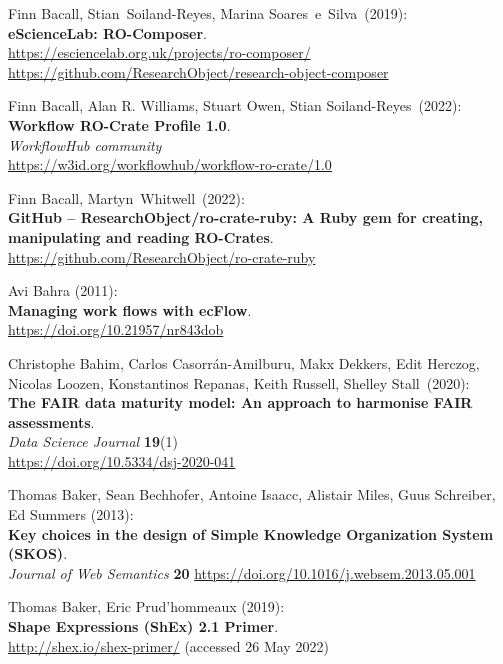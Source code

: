 \begin{thebibliography}{9}
Finn Bacall, Stian~Soiland-Reyes, Marina Soares~e~Silva~(2019):\\
\textbf{eScienceLab: RO-Composer}.\\
\url{https://esciencelab.org.uk/projects/ro-composer/}\\
\url{https://github.com/ResearchObject/research-object-composer}

Finn Bacall, Alan R. Williams, Stuart Owen, Stian
Soiland-Reyes~(2022):\\
\textbf{Workflow RO-Crate Profile 1.0}.\\
\emph{WorkflowHub community}\\
\url{https://w3id.org/workflowhub/workflow-ro-crate/1.0}

Finn Bacall, Martyn~Whitwell~(2022):\\
\textbf{GitHub -- ResearchObject/ro-crate-ruby: A Ruby gem for creating,
manipulating and reading RO-Crates}.\\
\url{https://github.com/ResearchObject/ro-crate-ruby}

Avi Bahra (2011):\\
\textbf{Managing work flows with ecFlow}.\\
\url{https://doi.org/10.21957/nr843dob}

Christophe Bahim, Carlos Casorrán-Amilburu, Makx Dekkers, Edit Herczog, Nicolas Loozen, Konstantinos Repanas, Keith Russell, Shelley Stall~(2020):\\
\textbf{The FAIR data maturity model: An approach to harmonise FAIR assessments}.\\
\emph{Data Science Journal} \textbf{19}(1)\\
\url{https://doi.org/10.5334/dsj-2020-041}

Thomas Baker, Sean Bechhofer, Antoine Isaacc, Alistair Miles, Guus Schreiber, Ed Summers (2013):\\
\textbf{Key choices in the design of Simple Knowledge Organization System (SKOS)}.\\
\emph{Journal of Web Semantics} \textbf{20}
\url{https://doi.org/10.1016/j.websem.2013.05.001}

Thomas Baker, Eric Prud'hommeaux (2019): \\
\textbf{Shape {Expressions} ({ShEx}) 2.1 {Primer}}. \\
\url{http://shex.io/shex-primer/} (accessed 26 May 2022)


\end{thebibliography}
